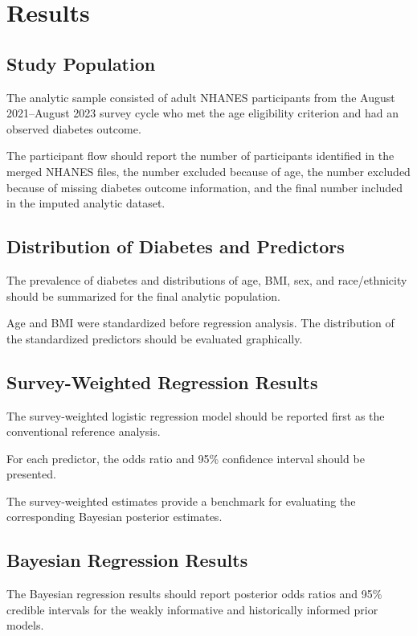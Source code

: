 \documentclass[12pt]{article}
\begin{document}
\section{Results}

\subsection{Study Population}

The analytic sample consisted of adult NHANES participants from the August 2021--August 2023 survey cycle who met the age eligibility criterion and had an observed diabetes outcome.

The participant flow should report the number of participants identified in the merged NHANES files, the number excluded because of age, the number excluded because of missing diabetes outcome information, and the final number included in the imputed analytic dataset.

\subsection{Distribution of Diabetes and Predictors}

The prevalence of diabetes and distributions of age, BMI, sex, and race/ethnicity should be summarized for the final analytic population.

Age and BMI were standardized before regression analysis. The distribution of the standardized predictors should be evaluated graphically.

\subsection{Survey-Weighted Regression Results}

The survey-weighted logistic regression model should be reported first as the conventional reference analysis.

For each predictor, the odds ratio and 95\% confidence interval should be presented.

The survey-weighted estimates provide a benchmark for evaluating the corresponding Bayesian posterior estimates.

\subsection{Bayesian Regression Results}

The Bayesian regression results should report posterior odds ratios and 95\% credible intervals for the weakly informative and historically informed prior models.
\end{document}
